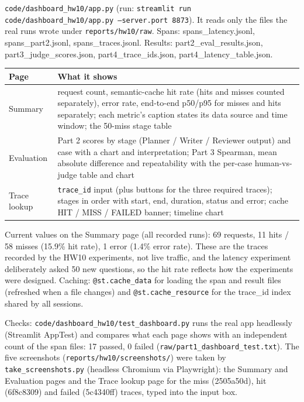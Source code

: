 \documentclass[11pt]{article}
\begin{document}
\texttt{code/\allowbreak{}dashboard\_\allowbreak{}hw10/\allowbreak{}app.py} (run: \texttt{streamlit run code/\allowbreak{}dashboard\_\allowbreak{}hw10/\allowbreak{}app.py --server.port 8873}). It reads only the files the real runs wrote under \texttt{reports/\allowbreak{}hw10/\allowbreak{}raw}. Spans: spans\_\allowbreak{}latency.jsonl, spans\_\allowbreak{}part2.jsonl, spans\_\allowbreak{}traces.jsonl. Results: part2\_\allowbreak{}eval\_\allowbreak{}results.json, part3\_\allowbreak{}judge\_\allowbreak{}scores.json, part4\_\allowbreak{}trace\_\allowbreak{}ids.json, part4\_\allowbreak{}latency\_\allowbreak{}table.json.

\begin{center}
{\small
\begin{tabular}{>{\raggedright\arraybackslash}p{1.0in}>{\raggedright\arraybackslash}p{5.2in}}
\toprule
\textbf{Page} & \textbf{What it shows} \\
\midrule
Summary & request count, semantic-cache hit rate (hits and misses counted separately), error rate, end-to-end p50/p95 for misses and hits separately; each metric's caption states its data source and time window; the 50-miss stage table \\
Evaluation & Part 2 scores by stage (Planner / Writer / Reviewer output) and case with a chart and interpretation; Part 3 Spearman, mean absolute difference and repeatability with the per-case human-vs-judge table and chart \\
Trace lookup & \texttt{trace\_\allowbreak{}id} input (plus buttons for the three required traces); stages in order with start, end, duration, status and error; cache HIT / MISS / FAILED banner; timeline chart \\
\bottomrule
\end{tabular}}
\end{center}
Current values on the Summary page (all recorded runs): 69 requests, 11 hits / 58 misses (15.9\% hit rate), 1 error (1.4\% error rate). These are the traces recorded by the HW10 experiments, not live traffic, and the latency experiment deliberately asked 50 new questions, so the hit rate reflects how the experiments were designed. Caching: \texttt{@st.cache\_\allowbreak{}data} for loading the span and result files (refreshed when a file changes) and \texttt{@st.cache\_\allowbreak{}resource} for the trace\_\allowbreak{}id index shared by all sessions.

Checks: \texttt{code/\allowbreak{}dashboard\_\allowbreak{}hw10/\allowbreak{}test\_\allowbreak{}dashboard.py} runs the real app headlessly (Streamlit AppTest) and compares what each page shows with an independent count of the span files: 17 passed, 0 failed (\texttt{raw/\allowbreak{}part1\_\allowbreak{}dashboard\_\allowbreak{}test.txt}). The five screenshots (\texttt{reports/\allowbreak{}hw10/\allowbreak{}screenshots/\allowbreak{}}) were taken by \texttt{take\_\allowbreak{}screenshots.py} (headless Chromium via Playwright): the Summary and Evaluation pages and the Trace lookup page for the miss (2505a50d), hit (6f8c8309) and failed (5c4340ff) traces, typed into the input box.
\end{document}
